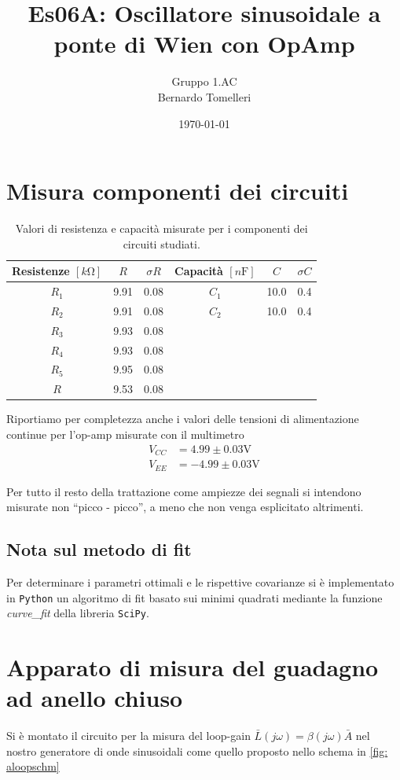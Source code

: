 \documentclass[10pt, a4paper, italian]{article}
\author{Gruppo 1.AC \\ Bernardo Tomelleri}
\title{Es06A: Oscillatore sinusoidale a ponte di Wien con OpAmp}
\begin{document}
\date{\today}
\maketitle

\setcounter{section}{0}

\section*{Misura componenti dei circuiti}
\begin{table}[htbp]
\centering
\begin{tabular}{cccccc}
\toprule
Resistenze $[\si{k\ohm}]$ & $R$ & $\sigma R$ & Capacità $[\si{n\F}]$ & $C$ &
$\sigma C$ \\
\midrule
\midrule
$R_1$	  & 9.91	& 0.08	 & $C_1$ & 10.0		 & 0.4 \\
$R_2$	  & 9.91	& 0.08 	 & $C_2$ & 10.0		 & 0.4 \\
$R_3$	  & 9.93	& 0.08	 & & & \\
$R_4$	  & 9.93	& 0.08	 & & & \\
$R_5$	  & 9.95	& 0.08	 & & & \\
$R$		  & 9.53	& 0.08	 & & & \\
\bottomrule     
\end{tabular}
\caption{Valori di resistenza e capacità misurate per i componenti dei
circuiti studiati. \label{tab: rcmes}}
\end{table}

Riportiamo per completezza anche i valori delle tensioni di alimentazione
continue per l'op-amp misurate con il multimetro
\begin{align*}
V_{CC} &= 4.99 \pm 0.03 \si{\V} \\
V_{EE} &= -4.99 \pm 0.03 \si{\V}
\end{align*}

Per tutto il resto della trattazione come ampiezze dei segnali si intendono
misurate non ``picco - picco'', a meno che non venga esplicitato altrimenti.

\subsection*{Nota sul metodo di fit}
Per determinare i parametri ottimali e le rispettive covarianze si \`e
implementato in \verb+Python+ un algoritmo di fit basato sui minimi quadrati
mediante la funzione \emph{curve\_fit} della libreria \texttt{SciPy}.

\section{Apparato di misura del guadagno ad anello chiuso}
Si è montato il circuito per la misura del loop-gain
$\bar{L}(j\omega) = \beta(j\omega) \bar{A}$ nel nostro generatore di
onde sinusoidali come quello proposto nello schema in \cref{fig: aloopschm}
\end{document}
